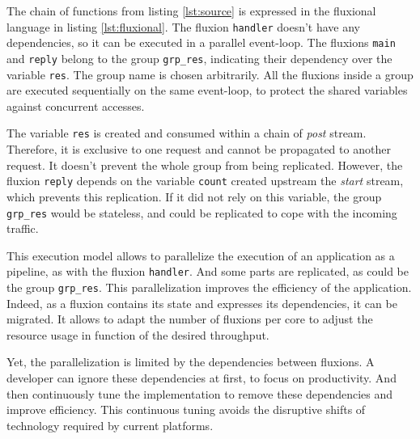 The chain of functions from listing \ref{lst:source} is expressed in the fluxional language in listing \ref{lst:fluxional}.
The fluxion \texttt{handler} doesn't have any dependencies, so it can be executed in a parallel event-loop.
The fluxions \texttt{main} and \texttt{reply} belong to the group \texttt{grp\_res}, indicating their dependency over the variable \texttt{res}.
The group name is chosen arbitrarily.
All the fluxions inside a group are executed sequentially on the same event-loop, to protect the shared variables against concurrent accesses.

The variable \texttt{res} is created and consumed within a chain of \textit{post} stream.
Therefore, it is exclusive to one request and cannot be propagated to another request.
It doesn't prevent the whole group from being replicated.
However, the fluxion \texttt{reply} depends on the variable \texttt{count} created upstream the \textit{start} stream, which prevents this replication.
If it did not rely on this variable, the group \texttt{grp\_res} would be stateless, and could be replicated to cope with the incoming traffic.


This execution model allows to parallelize the execution of an application as a pipeline, as with the fluxion \texttt{handler}.
And some parts are replicated, as could be the group \texttt{grp\_res}.
This parallelization improves the efficiency of the application.
Indeed, as a fluxion contains its state and expresses its dependencies, it can be migrated.
It allows to adapt the number of fluxions per core to adjust the resource usage in function of the desired throughput.

Yet, the parallelization is limited by the dependencies between fluxions.
A developer can ignore these dependencies at first, to focus on productivity.
And then continuously tune the implementation to remove these dependencies and improve efficiency.
This continuous tuning avoids the disruptive shifts of technology required by current platforms.
